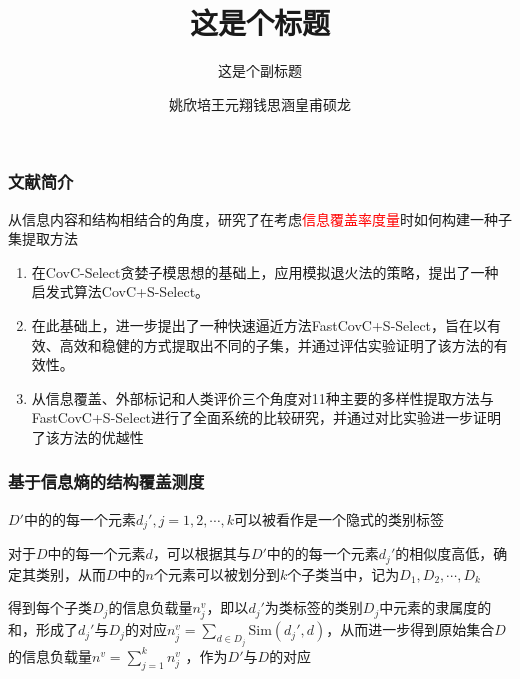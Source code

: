 \documentclass{../presentation}
\title{这是个标题}
\subtitle{这是个副标题}
\author{姚欣培\;王元翔\;钱思涵\;皇甫硕龙}
\newcommand{\Sim}{\text{Sim}}
\begin{document}
    \maketitle
    \small

    \begin{frame}
        \frametitle{文献简介}

        从信息内容和结构相结合的角度，研究了在考虑\textcolor{red}{信息覆盖率度量}时如何构建一种子集提取方法

        \begin{enumerate}
            \item 在CovC-Select贪婪子模思想的基础上，应用模拟退火法的策略，提出了一种启发式算法CovC+S-Select。

            \item 在此基础上，进一步提出了一种快速逼近方法FastCovC+S-Select，旨在以有效、高效和稳健的方式提取出不同的子集，并通过评估实验证明了该方法的有效性。

            \item 从信息覆盖、外部标记和人类评价三个角度对11种主要的多样性提取方法与FastCovC+S-Select进行了全面系统的比较研究，并通过对比实验进一步证明了该方法的优越性
        \end{enumerate}

    \end{frame}

    \begin{frame}
        \frametitle{基于信息熵的结构覆盖测度}

        $D'$中的的每一个元素$d_j', j=1,2,\cdots,k$可以被看作是一个隐式的类别标签

        对于$D$中的每一个元素$d$，可以根据其与$D'$中的的每一个元素$d_j'$的相似度高低，确定其类别，从而$D$中的$n$个元素可以被划分到$k$个子类当中，记为$D_1, D_2, \cdots ,D_k$

        得到每个子类$D_j$的信息负载量$n_j^v$，即以$d_j'$为类标签的类别$D_j$中元素的隶属度的和，形成了$d_j'$与$D_j$的对应$n_j^v=\sum_{d\in D_j}\Sim (d_j', d)$，从而进一步得到原始集合$D$的信息负载量$n^v=\sum _{j=1}^𝑘 n^v_j$ ，作为$D'$与$D$的对应

    \end{frame}
\end{document}
